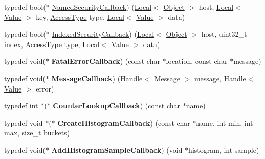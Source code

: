 \begin{DoxyCompactItemize}
\item 
typedef bool($\ast$ \hyperlink{namespacev8_ab5cafda0c556bba990c660ce9c904e0d}{Named\+Security\+Callback}) (\hyperlink{classv8_1_1_local}{Local}$<$ \hyperlink{classv8_1_1_object}{Object} $>$ host, \hyperlink{classv8_1_1_local}{Local}$<$ \hyperlink{classv8_1_1_value}{Value} $>$ key, \hyperlink{namespacev8_add8bef6469c5b94706584124e610046c}{Access\+Type} type, \hyperlink{classv8_1_1_local}{Local}$<$ \hyperlink{classv8_1_1_value}{Value} $>$ data)
\item 
typedef bool($\ast$ \hyperlink{namespacev8_aebbcc7837753e51112d944ad96520da1}{Indexed\+Security\+Callback}) (\hyperlink{classv8_1_1_local}{Local}$<$ \hyperlink{classv8_1_1_object}{Object} $>$ host, uint32\+\_\+t index, \hyperlink{namespacev8_add8bef6469c5b94706584124e610046c}{Access\+Type} type, \hyperlink{classv8_1_1_local}{Local}$<$ \hyperlink{classv8_1_1_value}{Value} $>$ data)
\item 
\hypertarget{namespacev8_abc93f69508701f18dc5cc0ce165616aa}{}typedef void($\ast$ {\bfseries Fatal\+Error\+Callback}) (const char $\ast$location, const char $\ast$message)\label{namespacev8_abc93f69508701f18dc5cc0ce165616aa}

\item 
\hypertarget{namespacev8_a26f4f3ae680876d9408a11d86f4e543d}{}typedef void($\ast$ {\bfseries Message\+Callback}) (\hyperlink{classv8_1_1_handle}{Handle}$<$ \hyperlink{classv8_1_1_message}{Message} $>$ message, \hyperlink{classv8_1_1_handle}{Handle}$<$ \hyperlink{classv8_1_1_value}{Value} $>$ error)\label{namespacev8_a26f4f3ae680876d9408a11d86f4e543d}

\item 
\hypertarget{namespacev8_a5efca05a9f1f278a4eec832ce419104f}{}typedef int $\ast$($\ast$ {\bfseries Counter\+Lookup\+Callback}) (const char $\ast$name)\label{namespacev8_a5efca05a9f1f278a4eec832ce419104f}

\item 
\hypertarget{namespacev8_aafbf15734701792a14c02dbca7535b75}{}typedef void $\ast$($\ast$ {\bfseries Create\+Histogram\+Callback}) (const char $\ast$name, int min, int max, size\+\_\+t buckets)\label{namespacev8_aafbf15734701792a14c02dbca7535b75}

\item 
\hypertarget{namespacev8_a5a7c6bb8050ad84f0a453056ec325d1c}{}typedef void($\ast$ {\bfseries Add\+Histogram\+Sample\+Callback}) (void $\ast$histogram, int sample)\label{namespacev8_a5a7c6bb8050ad84f0a453056ec325d1c}


\end{DoxyCompactItemize}
